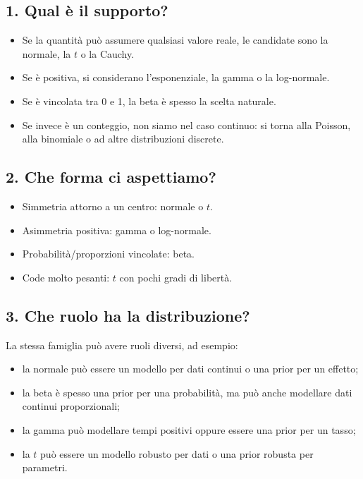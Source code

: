 \documentclass[
  italian,
  letterpaper,
  a4paper,
  11pt,
  open=any]{scrbook}
\providecommand{\tightlist}{%
  \setlength{\itemsep}{0pt}\setlength{\parskip}{0pt}}
\theoremstyle{plain}
\theoremstyle{definition}
\theoremstyle{definition}
\theoremstyle{remark}
\begin{document}
\subsection{1. Qual è il supporto?}\label{qual-uxe8-il-supporto}

\begin{itemize}
\tightlist
\item
  Se la quantità può assumere qualsiasi valore reale, le candidate sono
  la normale, la \(t\) o la Cauchy.
\item
  Se è positiva, si considerano l'esponenziale, la gamma o la
  log-normale.
\item
  Se è vincolata tra 0 e 1, la beta è spesso la scelta naturale.
\item
  Se invece è un conteggio, non siamo nel caso continuo: si torna alla
  Poisson, alla binomiale o ad altre distribuzioni discrete.
\end{itemize}

\subsection{2. Che forma ci aspettiamo?}\label{che-forma-ci-aspettiamo}

\begin{itemize}
\tightlist
\item
  Simmetria attorno a un centro: normale o \(t\).
\item
  Asimmetria positiva: gamma o log-normale.
\item
  Probabilità/proporzioni vincolate: beta.
\item
  Code molto pesanti: \(t\) con pochi gradi di libertà.
\end{itemize}

\subsection{3. Che ruolo ha la
distribuzione?}\label{che-ruolo-ha-la-distribuzione}

La stessa famiglia può avere ruoli diversi, ad esempio:

\begin{itemize}
\tightlist
\item
  la normale può essere un modello per dati continui o una prior per un
  effetto;
\item
  la beta è spesso una prior per una probabilità, ma può anche modellare
  dati continui proporzionali;
\item
  la gamma può modellare tempi positivi oppure essere una prior per un
  tasso;
\item
  la \(t\) può essere un modello robusto per dati o una prior robusta
  per parametri.
\end{itemize}
\end{document}
